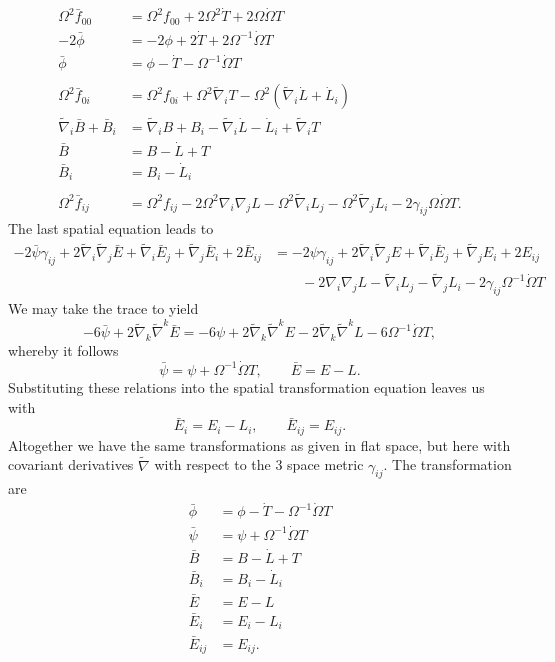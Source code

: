 \documentclass[10pt,letterpaper]{article}
\numberwithin{equation}{subsection}
\begin{document}
\begin{align}
	\Omega^2 \bar f_{00} &= \Omega^2 f_{00} + 2\Omega^2 \dot T + 2 \Omega\dot \Omega T\nonumber\\
	-2\bar\phi &= -2 \phi + 2\dot T+ 2 \Omega^{-1}\dot\Omega T\nonumber\\
	\bar\phi &= \phi - \dot T - \Omega^{-1}\dot\Omega T
\nonumber\\
\nonumber\\
	 \Omega^2 \bar f_{0i} &=  \Omega^2 f_{0i} +\Omega^2 \tilde\nabla_i T - \Omega^2(\tilde\nabla_i \dot L + \dot L_i)
\nonumber\\
	\tilde \nabla_i \bar B + \bar B_i &= \tilde\nabla_i B + B_i - \tilde\nabla_i \dot L - \dot L_i + \tilde\nabla_i T\\
	\bar B &= B - \dot L + T\\
	\bar B_i &= B_i - \dot L_i
\nonumber\\
\nonumber\\
	\Omega^2 \bar f_{ij} &=  \Omega^2 f_{ij} - 2\Omega^2\nabla_i\nabla_j L -\Omega^2 \tilde\nabla_i L_j-\Omega^2\tilde\nabla_j L_i - 2\gamma_{ij} \Omega \dot\Omega T.
\end{align}
The last spatial equation leads to
\begin{align}
-2\bar \psi \gamma_{ij} + 
	2\tilde\nabla_i\tilde\nabla_j \bar E + \tilde\nabla _i \bar E_j + \tilde\nabla_j \bar E_i + 2\bar E_{ij} &= 
-2\psi \gamma_{ij} + 
	2\tilde\nabla_i\tilde\nabla_j E + \tilde\nabla _i \bar E_j + \tilde\nabla_j E_i + 2E_{ij} 
\nonumber\\
&\qquad   - 2\nabla_i\nabla_j L - \tilde\nabla_i L_j-\tilde\nabla_j L_i - 2\gamma_{ij} \Omega^{-1} \dot\Omega T
\end{align}
We may take the trace to yield
\begin{equation}
-6\bar\psi + 2\tilde\nabla_k\tilde\nabla^k \bar E = -6\psi + 2\tilde\nabla_k\tilde\nabla^k E - 2\tilde\nabla_k \tilde\nabla^k L - 6 \Omega^{-1}\dot\Omega T,
\end{equation}
whereby it follows
\begin{equation}
 \bar\psi = \psi + \Omega^{-1}\dot\Omega T,\qquad \bar E = E-L.
\end{equation}
Substituting these relations into the spatial transformation equation leaves us with
\begin{equation}
	 \bar E_i = E_i - L_i,  \qquad
	 \bar E_{ij} = E_{ij}.
\end{equation}
Altogether we have the same transformations as given in flat space, but here with covariant derivatives $\tilde\nabla$ with respect to the 3 space metric $\gamma_{ij}$. The transformation are
\begin{align}
	\bar\phi &= \phi - \dot T -\Omega^{-1}\dot\Omega T\\
	 \bar\psi &= \psi + \Omega^{-1}\dot\Omega T\\
	\bar B &= B - \dot L + T\\
	\bar B_i &= B_i - \dot L_i\\
	\bar E &= E - L\\
	 \bar E_i &= E_i - L_i  \\
	 \bar E_{ij} &= E_{ij}.
\end{align}
\end{document}
